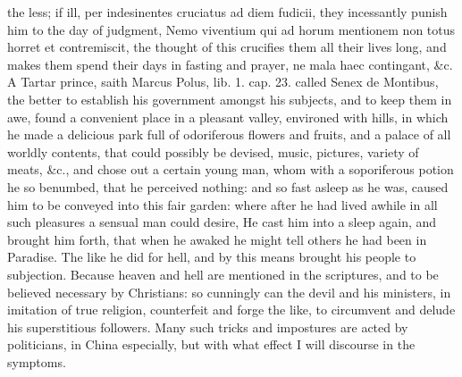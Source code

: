 {the less; if ill, per indesinentes cruciatus ad diem fudicii, they
incessantly punish him to the day of judgment, Nemo viventium qui ad
horum mentionem non totus horret et contremiscit, the thought of this
crucifies them all their lives long, and makes them spend their days in
fasting and prayer, ne mala haec contingant, \&c. A Tartar prince, saith
Marcus Polus, lib. 1. cap. 23. called Senex de Montibus, the better to
establish his government amongst his subjects, and to keep them in awe,
found a convenient place in a pleasant valley, environed with hills, in
which he made a delicious park full of odoriferous flowers and
fruits, and a palace of all worldly contents, that could possibly be
devised, music, pictures, variety of meats, \&c., and chose out a
certain young man, whom with a soporiferous potion he so
benumbed, that he perceived nothing: and so fast asleep as he was,
caused him to be conveyed into this fair garden: where after he had
lived awhile in all such pleasures a sensual man could desire, He
cast him into a sleep again, and brought him forth, that when he awaked
he might tell others he had been in Paradise. The like he did for hell,
and by this means brought his people to subjection. Because heaven and
hell are mentioned in the scriptures, and to be believed necessary by
Christians: so cunningly can the devil and his ministers, in imitation
of true religion, counterfeit and forge the like, to circumvent and
delude his superstitious followers. Many such tricks and impostures are
acted by politicians, in China especially, but with what effect I will
discourse in the symptoms.

}

